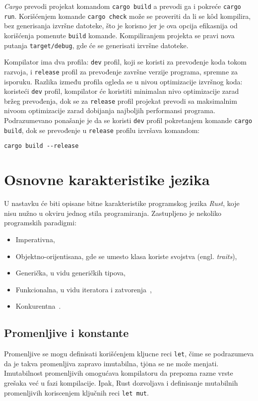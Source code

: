 \documentclass[12pt,oneside]{memoir}
\begin{document}


\emph{Cargo} prevodi projekat komandom
\texttt{cargo build} a prevodi ga i pokreće
\texttt{cargo run}. Korišćenjem komande \texttt{cargo check} 
može se proveriti da li se kôd kompilira, bez generisanja
izvršne datoteke, što je korisno jer je ova opcija efikasnija
od korišćenja pomenute \texttt{build} komande. Kompiliranjem
projekta se pravi nova putanja \texttt{target/debug}, gde će se 
generisati izvršne datoteke.

Kompilator ima dva profila: \texttt{dev} profil, koji se koristi za prevođenje koda tokom razvoja, i
\texttt{release} profil za prevođenje završne verzije programa, spremne za isporuku. Razlika između
profila ogleda se u nivou optimizacije izvršnog koda: koristeći \texttt{dev} profil, kompilator
će koristiti minimalan nivo optimizacije zarad bržeg prevođenja, dok se za \texttt{release} profil
projekat prevodi sa maksimalnim nivoom optimizacije zarad dobijanja najboljih performansi
programa. Podrazumevano ponašanje je da se koristi \texttt{dev} profil pokretanjem
komande \texttt{cargo build}, dok se prevođenje u \texttt{release} profilu izvršava komandom:

\begin{lstlisting}[language={}, style=text]
cargo build --release
\end{lstlisting}

\section{Osnovne karakteristike jezika}
U nastavku će biti opisane bitne karakteristike programskog jezika \emph{Rust}, koje nisu nužno
u okviru jednog stila programiranja. Zastupljeno je nekoliko programskih paradigmi:

\begin{itemize}
    \item Imperativna,
    \item Objektno-orijentisana, gde se umesto klasa koriste svojstva (engl. \emph{traits}),
    \item Generička, u vidu generičkih tipova,
    \item Funkcionalna, u vidu iteratora i zatvorenja~\cite{functional_rust},
    \item Konkurentna~\cite{concurrent_rust}.
\end{itemize}

\subsection{Promenljive i konstante}
Promenljive se mogu definisati korišćenjem kljucne reci \texttt{let}, čime se podrazumeva da
je takva promenljiva zapravo imutabilna, tj\. ona se ne može menjati. Imutabilnost
promenljivih omogućava kompilatoru da prepozna razne vrste grešaka već u fazi kompilacije.
Ipak, Rust dozvoljava i definisanje mutabilnih promenljivih koriscenjem ključnih reci \texttt{let mut}.
\end{document}
